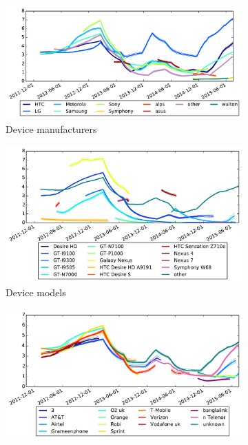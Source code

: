 \begin{figure}
\centering
\begin{subfigure}{\columnwidth}
\includegraphics[width=\columnwidth]{figures/security_score_manufacturer}
\caption{Device manufacturers}
\label{fig:security_score_manufacturer}
\end{subfigure}
%
\begin{subfigure}{\columnwidth}
\includegraphics[width=\columnwidth]{figures/security_score_model}
\caption{Device models}
\label{fig:security_score_model}
\end{subfigure}
%
\begin{subfigure}{\columnwidth}
\includegraphics[width=\columnwidth]{figures/security_score_operator}

\end{subfigure}
\end{figure}
